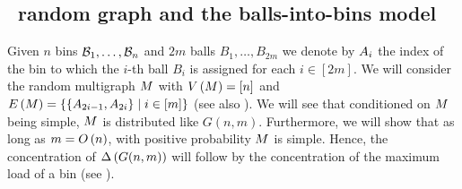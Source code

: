 \subsection{\ER\ random graph and the balls-into-bins model}\label{MDsub:strategy_without_complex}
Given $n$ bins $\mathcal{B}_1, \ldots, \mathcal{B}_n$ and $2m$ balls $B_1, \ldots, B_{2m}$ we denote by $A_i$ the index of the bin to which the $i$-th ball $B_i$ is assigned for each $i\in[2m]$. We will consider the random multigraph $M$ with $V\left(M\right)=[n]$ and $E\left(M\right)=\left\{\left\{A_{2i-1}, A_{2i}\right\} \mid i \in [m]\right\}$ (see also ). We will see that conditioned on $M$ being simple, $M$ is distributed like $G(n,m)$. Furthermore, we will show that as long as $m=O\left(n\right)$, with positive probability $M$ is simple. Hence, the concentration of $\Delta\left(G(n,m)\right)$ will follow by the concentration of the maximum load of a bin (see ).

